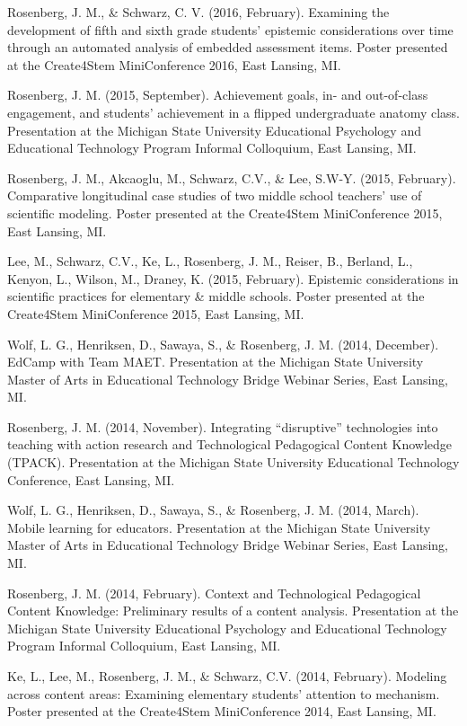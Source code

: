 \documentclass[]{article}
\begin{document}
Rosenberg, J. M., \& Schwarz, C. V. (2016, February). Examining the
development of fifth and sixth grade students' epistemic considerations
over time through an automated analysis of embedded assessment items.
Poster presented at the Create4Stem MiniConference 2016, East Lansing,
MI.

Rosenberg, J. M. (2015, September). Achievement goals, in- and
out-of-class engagement, and students' achievement in a flipped
undergraduate anatomy class. Presentation at the Michigan State
University Educational Psychology and Educational Technology Program
Informal Colloquium, East Lansing, MI.

Rosenberg, J. M., Akcaoglu, M., Schwarz, C.V., \& Lee, S.W-Y. (2015,
February). Comparative longitudinal case studies of two middle school
teachers' use of scientific modeling. Poster presented at the
Create4Stem MiniConference 2015, East Lansing, MI.

Lee, M., Schwarz, C.V., Ke, L., Rosenberg, J. M., Reiser, B., Berland,
L., Kenyon, L., Wilson, M., Draney, K. (2015, February). Epistemic
considerations in scientific practices for elementary \& middle schools.
Poster presented at the Create4Stem MiniConference 2015, East Lansing,
MI.

Wolf, L. G., Henriksen, D., Sawaya, S., \& Rosenberg, J. M. (2014,
December). EdCamp with Team MAET. Presentation at the Michigan State
University Master of Arts in Educational Technology Bridge Webinar
Series, East Lansing, MI.

Rosenberg, J. M. (2014, November). Integrating ``disruptive''
technologies into teaching with action research and Technological
Pedagogical Content Knowledge (TPACK). Presentation at the Michigan
State University Educational Technology Conference, East Lansing, MI.

Wolf, L. G., Henriksen, D., Sawaya, S., \& Rosenberg, J. M. (2014,
March). Mobile learning for educators. Presentation at the Michigan
State University Master of Arts in Educational Technology Bridge Webinar
Series, East Lansing, MI.

Rosenberg, J. M. (2014, February). Context and Technological Pedagogical
Content Knowledge: Preliminary results of a content analysis.
Presentation at the Michigan State University Educational Psychology and
Educational Technology Program Informal Colloquium, East Lansing, MI.

Ke, L., Lee, M., Rosenberg, J. M., \& Schwarz, C.V. (2014, February).
Modeling across content areas: Examining elementary students' attention
to mechanism. Poster presented at the Create4Stem MiniConference 2014,
East Lansing, MI.
\end{document}
